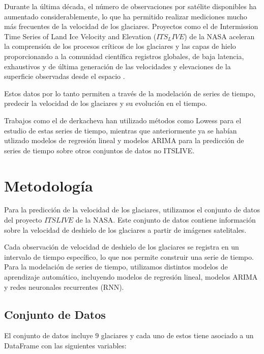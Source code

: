 \documentclass[sigconf,authordraft,language=spanish]{acmart}
\begin{document}
Durante la última década, el número de observaciones por satélite disponibles ha aumentado considerablemente, 
lo que ha permitido realizar mediciones mucho más frecuentes de la velocidad de los glaciares.
Proyectos como el de Intermission Time Series of Land Ice Velocity and Elevation ($ITS_LIVE$) de la NASA 
aceleran la comprensión de los procesos críticos de los glaciares y las capas de hielo proporcionando a la comunidad científica registros globales, 
de baja latencia, exhaustivos y de última generación de las velocidades y elevaciones de la superficie observadas desde el espacio \cite{lei_processing_2021} .

Estos datos por lo tanto permiten a través de la modelación de series de tiempo,
predecir la velocidad de los glaciares y su evolución en el tiempo. 

Trabajos como el de derkacheva \cite{derkacheva_data_2020} han utilizado métodos como Lowess para el estudio de estas series de tiempo, mientras que anteriormente 
ya se habían utlizado modelos de regresión lineal y modelos ARIMA para la predicción de series de tiempo \cite{noauthor_time_2022} sobre otros conjuntos de datos no ITSLIVE.

\section{Metodología}

Para la predicción de la velocidad de los glaciares, utilizamos el conjunto de datos del proyecto $ITSLIVE$ de la NASA.
Este conjunto de datos contiene información sobre la velocidad de deshielo de los glaciares a partir de imágenes satelitales.

Cada observación de velocidad de deshielo de los glaciares se registra en un intervalo de tiempo específico, lo que nos permite construir una serie de tiempo.
Para la modelación de series de tiempo, utilizamos distintos modelos de aprendizaje automático, incluyendo modelos de regresión lineal, modelos ARIMA y redes neuronales recurrentes (RNN).

\subsection{Conjunto de Datos}

El conjunto de datos incluye $9$ glaciares y cada uno de estos tiene asociado a un DataFrame con las siguientes variables:
\end{document}

